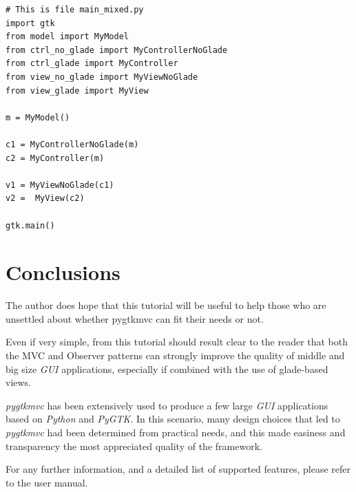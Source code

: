 \documentclass{article}
\newcommand{\kw}[1]{\emph{#1}\xspace}
\newcommand{\appl}[1]{\textsl{#1}\xspace}
\newcommand{\pygtk}{\appl{PyGTK}}
\newcommand{\python}{\appl{Python}}
\newcommand{\gui}{\kw{GUI}}
\newcommand{\pygtkmvc}{\kw{pygtkmvc}}
\newcommand{\codesize}{\small \color{codecolor}}
\begin{document}
{ \codesize 
\begin{verbatim}       
# This is file main_mixed.py
import gtk
from model import MyModel
from ctrl_no_glade import MyControllerNoGlade
from ctrl_glade import MyController
from view_no_glade import MyViewNoGlade
from view_glade import MyView

m = MyModel()

c1 = MyControllerNoGlade(m)
c2 = MyController(m)

v1 = MyViewNoGlade(c1)
v2 =  MyView(c2)

gtk.main()
\end{verbatim}
} 

\section{Conclusions}
The author does hope that this tutorial will be useful to help those
who are unsettled about whether pygtkmvc can fit their needs or not.

Even if very simple, from this tutorial should result clear to the
reader that both the MVC and Observer patterns can strongly improve
the quality of middle and big size \gui applications, especially if
combined with the use of glade-based views.

\pygtkmvc has been extensively used to produce a few large \gui
applications based on \python and \pygtk. In this scenario, many
design choices that led to \pygtkmvc had been determined from
practical needs, and this made easiness and transparency the most
appreciated quality of the framework.

For any further information, and a detailed list of supported
features, please refer to the user manual. 
\end{document}

